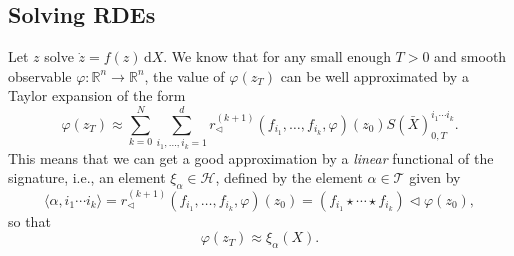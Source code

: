 \documentclass[10pt, reqno]{article}
\theoremstyle{definition}
\theoremstyle{plain}
\newcommand{\R}{\mathbb{R}}
\newcommand{\T}{\mathscr{T}}
\renewcommand{\H}{\mathscr{H}}
\begin{document}
\subsection{Solving RDEs}
Let \(z\) solve \(\dot z=f(z)\,\mathrm dX\).
We know that for any small enough \(T>0\) and smooth observable \(\varphi\colon\R^n\to\R^n\), the value of \(\varphi(z_T)\) can be
well approximated by a Taylor expansion of the form
\[
	\varphi(z_T)\approx\sum_{k=0}^N\sum_{i_1,\dotsc,i_k=1}^dr^{(k+1)}_\triangleleft(f_{i_1},\dotsc,f_{i_k},\varphi)(z_0)S(\bar X)^{i_1\dotsm i_k}_{0,T}.
\]
This means that we can get a good approximation by a \emph{linear} functional of the signature, i.e., an element
\(\xi_\alpha\in\H\), defined by the element \(\alpha\in\T\) given by
\[
	\langle \alpha,i_1\dotsm i_k\rangle=r^{(k+1)}_\triangleleft(f_{i_1},\dotsc,f_{i_k},\varphi)(z_0)=(f_{i_1}\star\dotsm\star f_{i_k})\triangleleft\varphi(z_0),
\]
so that
\[
	\varphi(z_T)\approx\xi_\alpha(X).
\]
\end{document}
